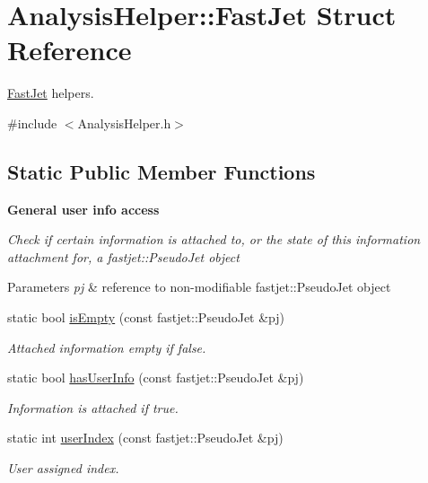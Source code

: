 \hypertarget{structAnalysisHelper_1_1FastJet}{}\section{Analysis\+Helper\+:\+:Fast\+Jet Struct Reference}
\label{structAnalysisHelper_1_1FastJet}


\hyperlink{structAnalysisHelper_1_1FastJet}{Fast\+Jet} helpers.  




{\ttfamily \#include $<$Analysis\+Helper.\+h$>$}

\subsection*{Static Public Member Functions}
\begin{Indent}{\bf General user info access}\par
{\em Check if certain information is attached to, or the state of this information attachment for, a {\ttfamily fastjet\+::\+Pseudo\+Jet} object


\begin{DoxyParams}{Parameters}
{\em pj} & reference to non-\/modifiable {\ttfamily fastjet\+::\+Pseudo\+Jet} object \\
\hline
\end{DoxyParams}
}\begin{DoxyCompactItemize}
\item 
static bool \hyperlink{structAnalysisHelper_1_1FastJet_a495b38c1db87612bbeb1d9f9d3634c63}{is\+Empty} (const fastjet\+::\+Pseudo\+Jet \&pj)
\begin{DoxyCompactList}\small\item\em Attached information empty if {\ttfamily false}. \end{DoxyCompactList}\item 
static bool \hyperlink{structAnalysisHelper_1_1FastJet_a61a31eef8ab3e4166208707f2b5551a7}{has\+User\+Info} (const fastjet\+::\+Pseudo\+Jet \&pj)
\begin{DoxyCompactList}\small\item\em Information is attached if {\ttfamily true}. \end{DoxyCompactList}\item 
static int \hyperlink{structAnalysisHelper_1_1FastJet_a27ddda4131fd0dffbf383882ff10e6c0}{user\+Index} (const fastjet\+::\+Pseudo\+Jet \&pj)
\begin{DoxyCompactList}\small\item\em User assigned index. \end{DoxyCompactList}\end{DoxyCompactItemize}
\end{Indent}
